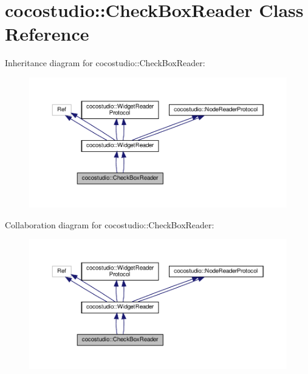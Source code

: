 \hypertarget{classcocostudio_1_1CheckBoxReader}{}\section{cocostudio\+:\+:Check\+Box\+Reader Class Reference}
\label{classcocostudio_1_1CheckBoxReader}


Inheritance diagram for cocostudio\+:\+:Check\+Box\+Reader\+:
\nopagebreak
\begin{figure}[H]
\begin{center}
\leavevmode
\includegraphics[width=350pt]{classcocostudio_1_1CheckBoxReader__inherit__graph}
\end{center}
\end{figure}


Collaboration diagram for cocostudio\+:\+:Check\+Box\+Reader\+:
\nopagebreak
\begin{figure}[H]
\begin{center}
\leavevmode
\includegraphics[width=350pt]{classcocostudio_1_1CheckBoxReader__coll__graph}
\end{center}
\end{figure}
